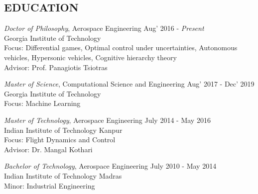 \documentclass[margin, 10pt]{res} %
\begin{document}
\begin{resume}

 



\section{EDUCATION}

{\sl Doctor of Philosophy}, Aerospace Engineering \hfill Aug' 2016 - \emph{Present} \\
Georgia Institute of Technology \\
Focus: Differential games, Optimal control under uncertainties, Autonomous vehicles, Hypersonic vehicles, Cognitive hierarchy theory\\
Advisor: Prof. Panagiotis Tsiotras

{\sl Master of Science}, Computational Science and Engineering \hfill Aug' 2017 - Dec' 2019\\
Georgia Institute of Technology \\
Focus: Machine Learning

{\sl Master of Technology}, Aerospace Engineering \hfill July 2014 - May 2016 \\
Indian Institute of Technology Kanpur \\
Focus: Flight Dynamics and Control\\
Advisor: Dr. Mangal Kothari

{\sl Bachelor of Technology}, Aerospace Engineering  \hfill July 2010 - May 2014 \\
Indian Institute of Technology Madras \\
Minor: Industrial Engineering
 
 

\end{resume}
\end{document}
